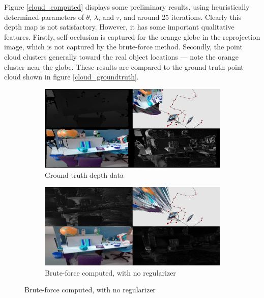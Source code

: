 \documentclass[conference]{IEEEtran}
\begin{document}
Figure \ref{cloud_computed} displays some preliminary results, using heuristically determined parameters of $\theta$, $\lambda$, and $\tau$, and around 25 iterations.
Clearly this depth map is not satisfactory. However, it has some important qualitative features. Firstly, self-occlusion is captured for the
orange globe in the reprojection image, which is not captured by the brute-force method. Secondly, the point cloud clusters generally
toward the real object locations --- note the orange cluster near the globe. These results are compared to the ground truth point cloud shown
in figure \ref{cloud_groundtruth}.


\begin{figure}[htbp]
\begin{subfigure}[b]{0.5\textwidth}
\centerline{\includegraphics[width=\textwidth]{figures/noisevis_groundtruth.png}}
\caption{Ground truth depth data}
\label{noisevis_groundtruth}
\end{subfigure}
\begin{subfigure}[b]{0.5\textwidth}
\centerline{\includegraphics[width=\textwidth]{figures/noisevis_computed.png}}
\caption{Brute-force computed, with no regularizer}
\label{noisevis_computed}
\end{subfigure}
\end{figure}
\end{document}
